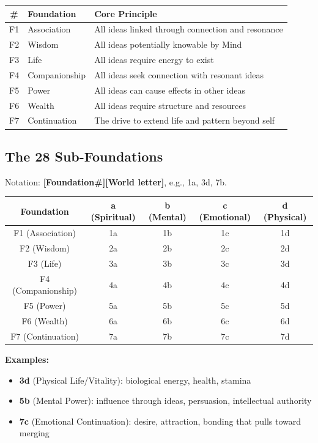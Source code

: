 \documentclass[11pt,twoside,openright]{book}
\theoremstyle{definition}
\theoremstyle{plain}
\theoremstyle{remark}
\begin{document}
\begin{center}
\begin{tabular}{cll}
\toprule
\textbf{\#} & \textbf{Foundation} & \textbf{Core Principle} \\
\midrule
F1 & Association & All ideas linked through connection and resonance \\
F2 & Wisdom & All ideas potentially knowable by Mind \\
F3 & Life & All ideas require energy to exist \\
F4 & Companionship & All ideas seek connection with resonant ideas \\
F5 & Power & All ideas can cause effects in other ideas \\
F6 & Wealth & All ideas require structure and resources \\
F7 & Continuation & The drive to extend life and pattern beyond self \\
\bottomrule
\end{tabular}
\end{center}

\subsection{The 28 Sub-Foundations}

Notation: \textbf{[Foundation\#][World letter]}, e.g., 1a, 3d, 7b.

\begin{center}
\begin{tabular}{c|cccc}
\toprule
\textbf{Foundation} & \textbf{a (Spiritual)} & \textbf{b (Mental)} & \textbf{c (Emotional)} & \textbf{d (Physical)} \\
\midrule
F1 (Association) & 1a & 1b & 1c & 1d \\
F2 (Wisdom) & 2a & 2b & 2c & 2d \\
F3 (Life) & 3a & 3b & 3c & 3d \\
F4 (Companionship) & 4a & 4b & 4c & 4d \\
F5 (Power) & 5a & 5b & 5c & 5d \\
F6 (Wealth) & 6a & 6b & 6c & 6d \\
F7 (Continuation) & 7a & 7b & 7c & 7d \\
\bottomrule
\end{tabular}
\end{center}

\textbf{Examples:}
\begin{itemize}
  \item \textbf{3d} (Physical Life/Vitality): biological energy, health, stamina
  \item \textbf{5b} (Mental Power): influence through ideas, persuasion, intellectual authority
  \item \textbf{7c} (Emotional Continuation): desire, attraction, bonding that pulls toward merging
\end{itemize}
\end{document}
